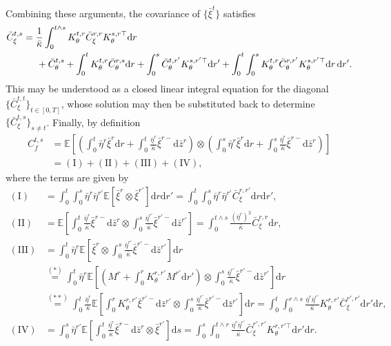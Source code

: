 \documentclass[11pt,letterpaper,reqno]{amsart}
\theoremstyle{definition}
\def\d{\mathrm{d}}
\def\E{\mathbb{E}}
\newcommand{\prn}[1]{\left({#1}\right)} %
\newcommand{\brk}[1]{\left[{#1}\right]} %
\begin{document}
Combining these arguments, the covariance of $\{\bar \xi^t\}$ satisfies
\begin{equation}\label{eq:cov-barxi}
\begin{aligned}
\bar C_\xi^{t,s}&= \frac{1}{\bar\kappa}\int_0^{t\wedge s}
K_\theta^{t,r}\bar C_\xi^{r,r}
K_\theta^{s,r\top} \d r\\
&\hspace{0.2in}+\bar C_\theta^{t,s} + \int_0^t K_\theta^{t,r} \bar C_\theta^{r,s}\d r +
\int_0^s \bar C_\theta^{t,r'} K_\theta^{s,r'\top} \d r' + \int_0^t \int_0^s
K_\theta^{t,r}\bar C_\theta^{r,r'}K_\theta^{s,r'\top} \d r\,\d r'.
\end{aligned}
\end{equation}
This may be understood as a closed linear integral equation for the diagonal
$\{\bar C_\xi^{t,t}\}_{t \in [0,T]}$, whose solution may then be
substituted back to determine $\{\bar C_\xi^{t,s}\}_{s \neq t}$.
Finally, by definition
\begin{align*}
C_f^{t,s} &= \E\brk{\prn{\int_0^t {\bar\eta^r} \bar \xi^{r} \d r + \int_0^t
\frac{\bar\eta^r}{\bar\kappa} \bar\xi^{r-} \d \bar z^r}
\otimes \prn{\int_0^s {\bar\eta^r} \bar \xi^r \d r + \int_0^s
\frac{\bar\eta^r}{\bar\kappa} \bar\xi^{r-} \d \bar z^r}}\nonumber\\
&=(\mathrm{I}) + (\mathrm{II}) + (\mathrm{III}) + (\mathrm{IV}),
\end{align*}
where the terms are given by
\begin{align*}
(\mathrm{I}) & = 
\int_0^t \int_0^s \bar\eta^r\bar\eta^{r'}\E[\bar\xi^r \otimes \bar\xi^{r'}]\d r
\d r'=\int_0^t \int_0^s \bar\eta^r\bar\eta^{r'}\bar C_\xi^{r,r'}\d r
\d r',\\
(\mathrm{II}) & = \E\brk{\int_0^t \frac{\bar\eta^r}{\bar\kappa} \bar\xi^{r-} \d \bar
z^r \otimes \int_0^s \frac{\bar\eta^{r'}}{\bar\kappa} \bar\xi^{r'-} \d \bar
z^{r'}} = \int_0^{t\wedge s} \frac{(\bar\eta^{r})^2}{\bar\kappa}\bar
C_\xi^{r,r}\d r,\\
(\mathrm{III}) &= \int_0^t {\bar\eta^r}\E\brk{\bar \xi^r  \otimes \int_0^s
\frac{\bar\eta^{r'}}{\bar\kappa} \bar \xi^{r'-} \d \bar z^{r'}}\d r\\
&\overset{(*)}{=}\int_0^t {\bar\eta^r}\E\brk{  \prn{M^r+\int_0^r K_\theta^{r,r'}
M^{r'} \d r'}  \otimes \int_0^s \frac{\bar\eta^{r'}}{\bar\kappa} \bar \xi^{r'-} \d \bar z^{r'}}\d r\\
&\overset{(**)}{=}\int_0^t \frac{\bar\eta^r}{\bar\kappa}\E\brk{\int_0^r K_\theta^{r,r'}\bar
\xi^{r'-} \d \bar z^{r'}  \otimes \int_0^s \frac{\bar\eta^{r'}}{\bar\kappa}
\bar\xi^{r'-} \d \bar z^{r'}}\d r = \int_0^t \int_0^{r\wedge s}
\frac{\bar\eta^r\bar\eta^{r'}}{\bar\kappa}
K_\theta^{r,r'}\bar C_\xi^{r',r'} \d {r'}\d r,\\
(\mathrm{IV})&=\int_0^s \bar\eta^{r'} \E\brk{\int_0^t
\frac{\bar\eta^r}{\bar\kappa} \bar\xi^{r-}\d \bar z^r
\otimes \bar \xi^{r'}} \d s
=\int_0^s \int_0^{t \wedge r} 
\frac{\bar\eta^r\bar \eta^{r'}}{\bar\kappa} 
\bar C_\xi^{r',r'}K_\theta^{r,r'\top}\d r'\d r.
\end{align*}
\end{document}
